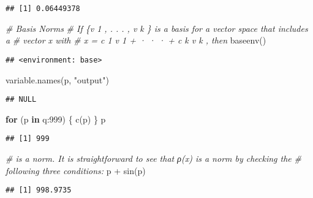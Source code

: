 \documentclass[
]{article}
\newenvironment{Shaded}{\begin{snugshade}}{\end{snugshade}}
\newcommand{\CommentTok}[1]{\textcolor[rgb]{0.56,0.35,0.01}{\textit{#1}}}
\newcommand{\ControlFlowTok}[1]{\textcolor[rgb]{0.13,0.29,0.53}{\textbf{#1}}}
\newcommand{\DecValTok}[1]{\textcolor[rgb]{0.00,0.00,0.81}{#1}}
\newcommand{\FunctionTok}[1]{\textcolor[rgb]{0.00,0.00,0.00}{#1}}
\newcommand{\NormalTok}[1]{#1}
\newcommand{\SpecialCharTok}[1]{\textcolor[rgb]{0.00,0.00,0.00}{#1}}
\newcommand{\StringTok}[1]{\textcolor[rgb]{0.31,0.60,0.02}{#1}}
\begin{document}
\begin{verbatim}
## [1] 0.06449378
\end{verbatim}

\begin{Shaded}
\begin{Highlighting}[]
\CommentTok{\# Basis Norms}
\CommentTok{\# If \{v 1 , . . . , v k \} is a basis for a vector space that includes a }
\CommentTok{\# vector x with}
\CommentTok{\# x = c 1 v 1 + · · · + c k v k , then}
\FunctionTok{baseenv}\NormalTok{()}
\end{Highlighting}
\end{Shaded}

\begin{verbatim}
## <environment: base>
\end{verbatim}

\begin{Shaded}
\begin{Highlighting}[]
\FunctionTok{variable.names}\NormalTok{(p, }\StringTok{"output"}\NormalTok{)}
\end{Highlighting}
\end{Shaded}

\begin{verbatim}
## NULL
\end{verbatim}

\begin{Shaded}
\begin{Highlighting}[]
\ControlFlowTok{for}\NormalTok{ (p }\ControlFlowTok{in}\NormalTok{ q}\SpecialCharTok{:}\DecValTok{999}\NormalTok{) \{}
  \FunctionTok{c}\NormalTok{(p)}
\NormalTok{\}}
\NormalTok{p}
\end{Highlighting}
\end{Shaded}

\begin{verbatim}
## [1] 999
\end{verbatim}

\begin{Shaded}
\begin{Highlighting}[]
\CommentTok{\# is a norm. It is straightforward to see that ρ(x) is a norm by checking the}
\CommentTok{\# following three conditions:}
\NormalTok{p }\SpecialCharTok{+} \FunctionTok{sin}\NormalTok{(p)}
\end{Highlighting}
\end{Shaded}

\begin{verbatim}
## [1] 998.9735
\end{verbatim}
\end{document}
